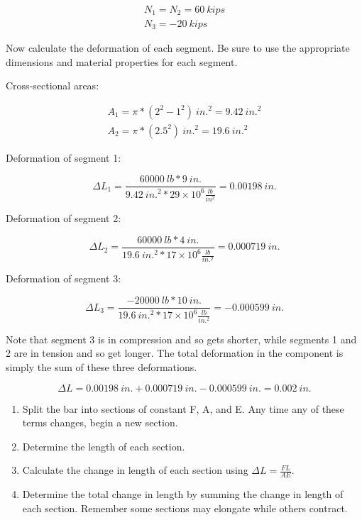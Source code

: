 \documentclass[
  letterpaper,
  DIV=11,
  numbers=noendperiod]{scrreprt}
\theoremstyle{definition}
\theoremstyle{remark}
\begin{document}
\begin{tcolorbox}
\begin{tcolorbox}
\[
\begin{gathered}
N_1=N_2=60{~kips} \\
N_3=-20{~kips}
\end{gathered}
\]

Now calculate the deformation of each segment. Be sure to use the
appropriate dimensions and material properties for each segment.

Cross-sectional areas:

\[
\begin{gathered}
A_1=\pi*(2^2-1^2){~in.}^2=9.42{~in.}^2 \\
A_2=\pi*(2.5^2){~in.}^2=19.6{~in.}^2
\end{gathered}
\]

Deformation of segment 1:

\[
\Delta L_1=\frac{60000{~lb} * 9{~in.}}{9.42{~in.}^2 * 29 \times 10^6\frac{lb}{in^2}}=0.00198{~in.}
\]

Deformation of segment 2:

\[
\Delta L_2=\frac{60000{~lb} * 4{~in.}}{19.6{~in.}^2 * 17 \times 10^6\frac{lb}{in.^2}}=0.000719{~in} .
\]

Deformation of segment 3:

\[
\Delta L_3=\frac{-20000{~lb} * 10{~in.}}{19.6{~in.}^2 * 17 \times 10^6\frac{lb}{in.^2}}=-0.000599{~in.}
\]

Note that segment 3 is in compression and so gets shorter, while
segments 1 and 2 are in tension and so get longer. The total deformation
in the component is simply the sum of these three deformations.

\[
\Delta L=0.00198{~in.}+0.000719{~in.}-0.000599{~in.}=0.002{~in.}
\]

\end{tcolorbox}

\end{tcolorbox}

\begin{tcolorbox}[enhanced jigsaw, leftrule=.75mm, colbacktitle=quarto-callout-warning-color!10!white, breakable, opacityback=0, colback=white, titlerule=0mm, toprule=.15mm, colframe=quarto-callout-warning-color-frame, coltitle=black, title={Step-by-step: Axial deformation}, toptitle=1mm, bottomrule=.15mm, rightrule=.15mm, left=2mm, arc=.35mm, opacitybacktitle=0.6, bottomtitle=1mm]

\begin{enumerate}
\def\labelenumi{\arabic{enumi}.}
\item
  Split the bar into sections of constant F, A, and E. Any time any of
  these terms changes, begin a new section.
\item
  Determine the length of each section.
\item
  Calculate the change in length of each section using
  \(\Delta L=\frac{F L}{A E}\).
\item
  Determine the total change in length by summing the change in length
  of each section. Remember some sections may elongate while others
  contract.
\end{enumerate}

\end{tcolorbox}
\end{document}
